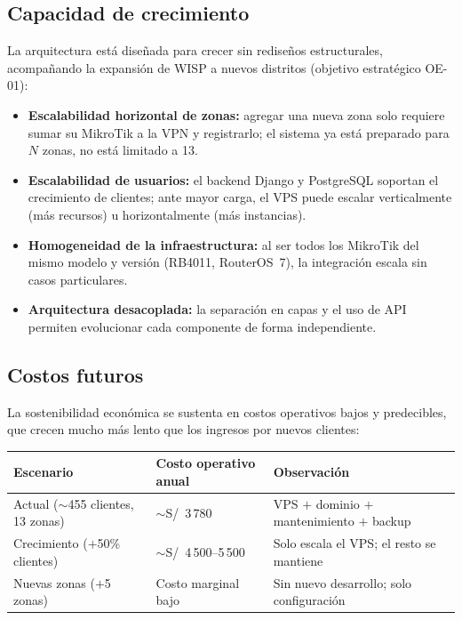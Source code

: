 \subsection{Capacidad de crecimiento}

La arquitectura está diseñada para crecer sin rediseños estructurales, acompañando la
expansión de WISP a nuevos distritos (objetivo estratégico OE-01):

\begin{itemize}[leftmargin=1.4em]
  \item \textbf{Escalabilidad horizontal de zonas:} agregar una nueva zona solo
  requiere sumar su MikroTik a la VPN y registrarlo; el sistema ya está preparado para
  $N$ zonas, no está limitado a 13.
  \item \textbf{Escalabilidad de usuarios:} el backend Django y PostgreSQL soportan el
  crecimiento de clientes; ante mayor carga, el VPS puede escalar verticalmente (más
  recursos) u horizontalmente (más instancias).
  \item \textbf{Homogeneidad de la infraestructura:} al ser todos los MikroTik del
  mismo modelo y versión (RB4011, RouterOS~7), la integración escala sin casos
  particulares.
  \item \textbf{Arquitectura desacoplada:} la separación en capas y el uso de API
  permiten evolucionar cada componente de forma independiente.
\end{itemize}

\subsection{Costos futuros}

La sostenibilidad económica se sustenta en costos operativos bajos y predecibles, que
crecen mucho más lento que los ingresos por nuevos clientes:

\begin{center}
\label{tab:costos-futuros}
\begin{tabularx}{\textwidth}{L{4.2cm} L{3.4cm} X}
\toprule
\textbf{Escenario} & \textbf{Costo operativo anual} & \textbf{Observación} \\
\midrule
Actual ($\sim$455 clientes, 13 zonas) & $\sim$S/~3\,780 &
VPS $+$ dominio $+$ mantenimiento $+$ backup \\
Crecimiento ($+$50\% clientes) & $\sim$S/~4\,500--5\,500 &
Solo escala el VPS; el resto se mantiene \\
Nuevas zonas ($+$5 zonas) & Costo marginal bajo &
Sin nuevo desarrollo; solo configuración \\
\bottomrule
\end{tabularx}
\end{center}

